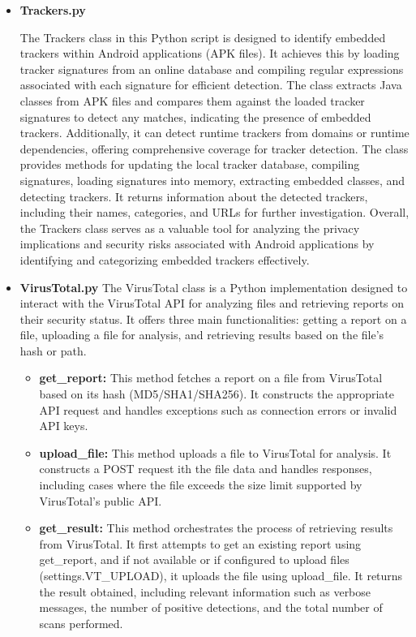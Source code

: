 \documentclass{report}
\begin{document}
\begin{itemize}
    \item \textbf{Trackers.py}
    
    The Trackers class in this Python script is designed to identify embedded trackers within Android applications (APK files). It achieves this by loading tracker signatures from an online database and compiling regular expressions associated with each signature for efficient detection. The class extracts Java classes from APK files and compares them against the loaded tracker signatures to detect any matches, indicating the presence of embedded trackers. Additionally, it can detect runtime trackers from domains or runtime dependencies, offering comprehensive coverage for tracker detection. The class provides methods for updating the local tracker database, compiling signatures, loading signatures into memory, extracting embedded classes, and detecting trackers. It returns information about the detected trackers, including their names, categories, and URLs for further investigation. Overall, the Trackers class serves as a valuable tool for analyzing the privacy implications and security risks associated with Android applications by identifying and categorizing embedded trackers effectively.

    \item \textbf{VirusTotal.py}
    The VirusTotal class is a Python implementation designed to interact with the VirusTotal API for analyzing files and retrieving reports on their security status. It offers three main functionalities: getting a report on a file, uploading a file for analysis, and retrieving results based on the file's hash or path.
    \begin{itemize}
        \item \textbf {get\_report:} This method fetches a report on a file from VirusTotal based on its hash (MD5/SHA1/SHA256). It constructs the appropriate API request and handles exceptions such as connection errors or invalid API keys.    
        \item \textbf {upload\_file:} This method uploads a file to VirusTotal for analysis. It constructs a POST request ith the file data and handles responses, including cases where the file exceeds the size limit supported by VirusTotal's public API.
        \item \textbf{get\_result:} This method orchestrates the process of retrieving results from VirusTotal. It first attempts to get an existing report using get\_report, and if not available or if configured to upload files (settings.VT\_UPLOAD), it uploads the file using upload\_file. It returns the result obtained, including relevant information such as verbose messages, the number of positive detections, and the total number of scans performed.
        

\end{itemize}
\end{itemize}
\end{document}
